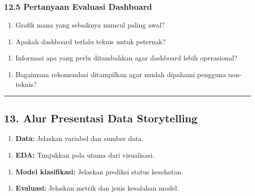 \documentclass[12pt,a4paper]{article}
\begin{document}
\subsubsection{12.5 Pertanyaan Evaluasi Dashboard}

\begin{enumerate}
\item Grafik mana yang sebaiknya muncul paling awal?
\end{enumerate}

\begin{enumerate}
\item Apakah dashboard terlalu teknis untuk peternak?
\end{enumerate}

\begin{enumerate}
\item Informasi apa yang perlu ditambahkan agar dashboard lebih operasional?
\end{enumerate}

\begin{enumerate}
\item Bagaimana rekomendasi ditampilkan agar mudah dipahami pengguna non-teknis?
\end{enumerate}


\hrule


\subsection{13. Alur Presentasi Data Storytelling}

\begin{enumerate}
\item \textbf{Data:} Jelaskan variabel dan sumber data.
\end{enumerate}

\begin{enumerate}
\item \textbf{EDA:} Tunjukkan pola utama dari visualisasi.
\end{enumerate}

\begin{enumerate}
\item \textbf{Model klasifikasi:} Jelaskan prediksi status kesehatan.
\end{enumerate}

\begin{enumerate}
\item \textbf{Evaluasi:} Jelaskan metrik dan jenis kesalahan model.
\end{enumerate}
\end{document}
